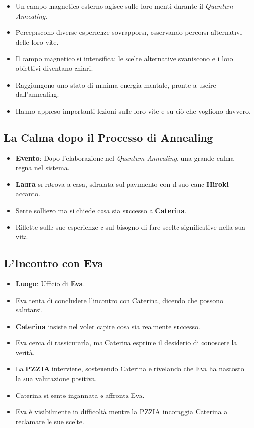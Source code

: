\begin{itemize}
    \item Un campo magnetico esterno agisce sulle loro menti durante il \emph{Quantum Annealing}.
    \item Percepiscono diverse esperienze sovrapporsi, osservando percorsi alternativi delle loro vite.
    \item Il campo magnetico si intensifica; le scelte alternative svaniscono e i loro obiettivi diventano chiari.
    \item Raggiungono uno stato di minima energia mentale, pronte a uscire dall'annealing.
    \item Hanno appreso importanti lezioni sulle loro vite e su ciò che vogliono davvero.
\end{itemize}

\subsection*{La Calma dopo il Processo di Annealing}

\begin{itemize}
    \item \textbf{Evento}: Dopo l'elaborazione nel \emph{Quantum Annealing}, una grande calma regna nel sistema.
    \item \textbf{Laura} si ritrova a casa, sdraiata sul pavimento con il suo cane \textbf{Hiroki} accanto.
    \item Sente sollievo ma si chiede cosa sia successo a \textbf{Caterina}.
    \item Riflette sulle sue esperienze e sul bisogno di fare scelte significative nella sua vita.
\end{itemize}

\subsection*{L'Incontro con Eva}

\begin{itemize}
    \item \textbf{Luogo}: Ufficio di \textbf{Eva}.
    \item Eva tenta di concludere l'incontro con Caterina, dicendo che possono salutarsi.
    \item \textbf{Caterina} insiste nel voler capire cosa sia realmente successo.
    \item Eva cerca di rassicurarla, ma Caterina esprime il desiderio di conoscere la verità.
    \item La \textbf{PZZIA} interviene, sostenendo Caterina e rivelando che Eva ha nascosto la sua valutazione positiva.
    \item Caterina si sente ingannata e affronta Eva.
    \item Eva è visibilmente in difficoltà mentre la PZZIA incoraggia Caterina a reclamare le sue scelte.
\end{itemize}

